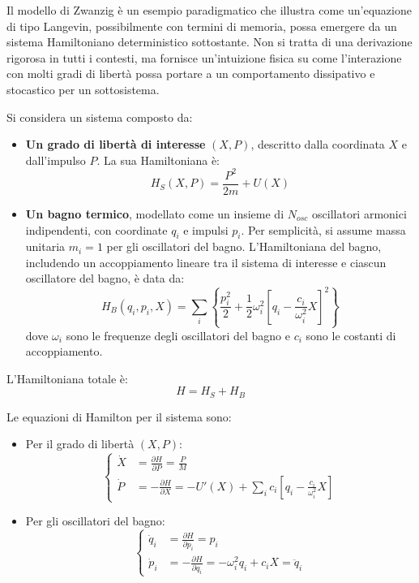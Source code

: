 Il modello di Zwanzig è un esempio paradigmatico che illustra come un'equazione di tipo Langevin, possibilmente con termini di memoria, possa emergere da un sistema Hamiltoniano deterministico sottostante. Non si tratta di una derivazione rigorosa in tutti i contesti, ma fornisce un'intuizione fisica su come l'interazione con molti gradi di libertà possa portare a un comportamento dissipativo e stocastico per un sottosistema.

Si considera un sistema composto da:
\begin{itemize}
    \item \textbf{Un grado di libertà di interesse} $(X, P)$, descritto dalla coordinata $X$ e dall'impulso $P$. La sua Hamiltoniana è:
    \begin{equation*}
    H_S(X,P) = \frac{P^2}{2m} + U(X)
    \end{equation*}
    \item \textbf{Un bagno termico}, modellato come un insieme di $N_{osc}$ oscillatori armonici indipendenti, con coordinate $q_i$ e impulsi $p_i$. Per semplicità, si assume massa unitaria $m_i=1$ per gli oscillatori del bagno. L'Hamiltoniana del bagno, includendo un accoppiamento lineare tra il sistema di interesse e ciascun oscillatore del bagno, è data da:
    \begin{equation}
    H_B(q_i, p_i, X) = \sum_i \left\{ \frac{p_i^2}{2} + \frac{1}{2}\omega_i^2 \left[ q_i - \frac{c_i}{\omega_i^2}X \right]^2 \right\}
    \end{equation}
    dove $\omega_i$ sono le frequenze degli oscillatori del bagno e $c_i$ sono le costanti di accoppiamento.
\end{itemize}

L'Hamiltoniana totale è:
\begin{equation*} 
H = H_S + H_B 
\end{equation*}

Le equazioni di Hamilton per il sistema sono:
\begin{itemize}
    \item Per il grado di libertà $(X,P)$:
    \begin{equation} \begin{cases}
    \dot{X} &= \frac{\partial H}{\partial P} = \frac{P}{M} \\ 
    \dot{P} &= -\frac{\partial H}{\partial X} = -U'(X) + \sum_i c_i \left[ q_i - \frac{c_i}{\omega_i^2}X \right]
    \end{cases} \end{equation}
    \item Per gli oscillatori del bagno:
    \begin{equation} \begin{cases}
    \dot{q}_i &= \frac{\partial H}{\partial p_i} = p_i \\ 
    \dot{p}_i &= -\frac{\partial H}{\partial q_i}  = -\omega_i^2 q_i + c_i X = \ddot{q}_i
    \end{cases} \end{equation}
\end{itemize}

